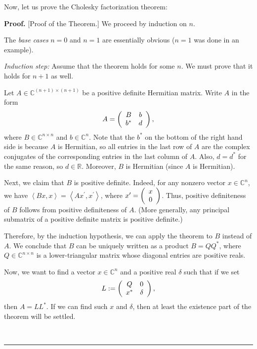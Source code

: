 \documentclass[numbers=enddot,12pt,final,onecolumn,notitlepage]{scrartcl}%
\numberwithin{exer}{subsection}
\theoremstyle{definition}
\newenvironment{proof}[1][Proof]{\noindent\textbf{#1.} }{\ \rule{0.5em}{0.5em}}
\begin{document}
Now, let us prove the Cholesky factorization theorem:

\begin{proof}
[Proof of the Theorem.] We proceed by induction on $n$.

The \textit{base cases} $n=0$ and $n=1$ are essentially obvious ($n=1$ was
done in an example).

\textit{Induction step:} Assume that the theorem holds for some $n$. We must
prove that it holds for $n+1$ as well.

Let $A\in\mathbb{C}^{\left(  n+1\right)  \times\left(  n+1\right)  }$ be a
positive definite Hermitian matrix. Write $A$ in the form%
\[
A=\left(
\begin{array}
[c]{cc}%
B & b\\
b^{\ast} & d
\end{array}
\right)  ,
\]
where $B\in\mathbb{C}^{n\times n}$ and $b\in\mathbb{C}^{n}$. Note that the
$b^{\ast}$ on the bottom of the right hand side is because $A$ is Hermitian,
so all entries in the last row of $A$ are the complex conjugates of the
corresponding entries in the last column of $A$. Also, $d=d^{\ast}$ for the
same reason, so $d\in\mathbb{R}$. Moreover, $B$ is Hermitian (since $A$ is Hermitian).

Next, we claim that $B$ is positive definite. Indeed, for any nonzero vector
$x\in\mathbb{C}^{n}$, we have $\left\langle Bx,x\right\rangle =\left\langle
Ax^{\prime},x^{\prime}\right\rangle $, where $x^{\prime}=\left(
\begin{array}
[c]{c}%
x\\
0
\end{array}
\right)  $. Thus, positive definiteness of $B$ follows from positive
definiteness of $A$. (More generally, any principal submatrix of a positive
definite matrix is positive definite.)

Therefore, by the induction hypothesis, we can apply the theorem to $B$
instead of $A$. We conclude that $B$ can be uniquely written as a product
$B=QQ^{\ast}$, where $Q\in\mathbb{C}^{n\times n}$ is a lower-triangular matrix
whose diagonal entries are positive reals.

Now, we want to find a vector $x\in\mathbb{C}^{n}$ and a positive real
$\delta$ such that if we set%
\[
L:=\left(
\begin{array}
[c]{cc}%
Q & 0\\
x^{\ast} & \delta
\end{array}
\right)  ,
\]
then $A=LL^{\ast}$. If we can find such $x$ and $\delta$, then at least the
existence part of the theorem will be settled.


\end{proof}
\end{document}

